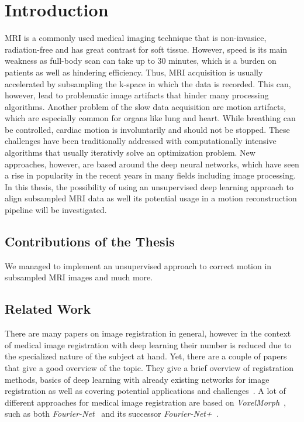 \documentclass[english,version-2022-01]{uzl-thesis} %
\begin{document}

\chapter{Introduction} \label{Ch:Introduction}
MRI is a commonly used medical imaging technique that is non-invasice, radiation-free and has great contrast for soft tissue. However, speed is its main weakness as full-body scan can take up to 30 minutes, which is a burden on patients as well as hindering efficiency. Thus, MRI acquisition is usually accelerated by subsampling the k-space in which the data is recorded. This can, however, lead to problematic image artifacts that hinder many processing algorithms. Another problem of the slow data acquisition are motion artifacts, which are especially common for organs like lung and heart. While breathing can be controlled, cardiac motion is involuntarily and should not be stopped. These challenges have been traditionally addressed with computationally intensive algorithms that usually iterativly solve an optimization problem. New approaches, however, are based around the deep neural networks, which have seen a rise in popularity in the recent years in many fields including image processing. In this thesis, the possibility of using an unsupervised deep learning approach to align subsampled MRI data as well its potential usage in a motion reconstruction pipeline will be investigated.

\section{Contributions of the Thesis} \label{Sec:Contributions}
We managed to implement an unsupervised approach to correct motion in subsampled MRI images and much more. 

\section{Related Work} \label{Sec:RelatedWork}
There are many papers on image registration in general, however in the context of medical image registration with deep learning their number is reduced due to the specialized nature of the subject at hand. Yet, there are a couple of papers that give a good overview of the topic.
They give a brief overview of registration methods, basics of deep learning with already existing networks for image registration as well as covering potential applications and challenges~\cite{Chen2020,Haskins2020,Fu2020,Zou2022,Chen2023}.
A lot of different approaches for medical image registration are based on \emph{VoxelMorph}~\cite{Voxelmorph}, such as both \emph{Fourier-Net}~\cite{Fourier-Net} and its successor \emph{Fourier-Net+}~\cite{Fourier-Net+}.
\end{document}
